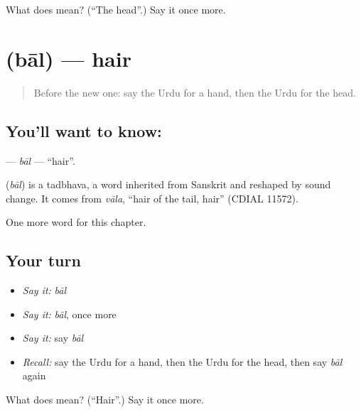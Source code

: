\begin{tcolorbox}[breakable,colback=teal!4,colframe=teal!35!black,title={Before you move on}]
What does  mean? (\textquotedblleft{}The head\textquotedblright{}.) Say it once more.
\end{tcolorbox}
\section[\texorpdfstring{\ur{بال} (bāl)}{بال (bāl)}]{ (bāl) — hair}

\label{lesson:UR-C38-bal}



\begin{quote}
Before the new one: say the Urdu for a hand, then the Urdu for the head.
\end{quote}

\subsection*{You'll want to know: }
\textbf{} — \emph{bāl} — \textquotedblleft{}hair\textquotedblright{}.

\begin{cousinweb}
\textbf{} (\emph{bāl}) is a tadbhava, a word inherited from Sanskrit and reshaped by sound change. It comes from \emph{vāla}, \textquotedblleft{}hair of the tail, hair\textquotedblright{} (CDIAL 11572).
\end{cousinweb}

\begin{grammarlens}[title={What you've built}]
One more word for this chapter.
\end{grammarlens}

\subsection*{Your turn}
\begin{itemize}
\raggedright
  \item \emph{Say it:} \emph{bāl}
  \item \emph{Say it:} \emph{bāl}, once more
  \item \emph{Say it:} say \emph{bāl}
  \item \emph{Recall:} say the Urdu for a hand, then the Urdu for the head, then say \emph{bāl} again
\end{itemize}

\begin{tcolorbox}[breakable,colback=teal!4,colframe=teal!35!black,title={Before you move on}]
What does  mean? (\textquotedblleft{}Hair\textquotedblright{}.) Say it once more.
\end{tcolorbox}
